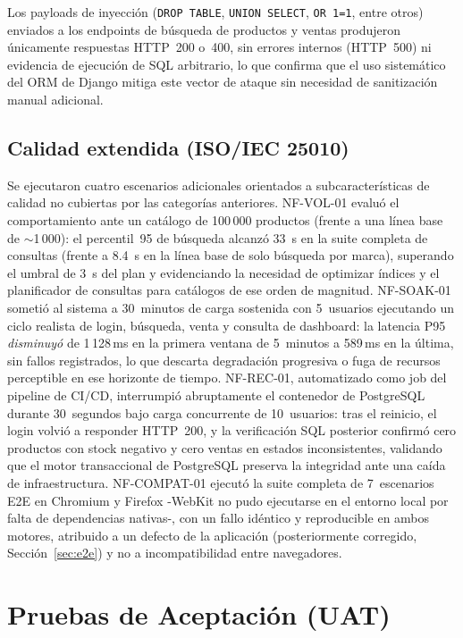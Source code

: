 \documentclass[conference]{IEEEtran}
\begin{document}
Los payloads de inyección (\texttt{DROP TABLE}, \texttt{UNION SELECT}, \texttt{OR 1=1}, entre otros) enviados a los endpoints de búsqueda de productos y ventas produjeron únicamente respuestas HTTP~200 o~400, sin errores internos (HTTP~500) ni evidencia de ejecución de SQL arbitrario, lo que confirma que el uso sistemático del ORM de Django mitiga este vector de ataque sin necesidad de sanitización manual adicional.

\subsection{Calidad extendida (ISO/IEC 25010)}

Se ejecutaron cuatro escenarios adicionales orientados a subcaracterísticas de calidad no cubiertas por las categorías anteriores. NF-VOL-01 evaluó el comportamiento ante un catálogo de 100\,000 productos (frente a una línea base de $\sim$1\,000): el percentil~95 de búsqueda alcanzó 33~s en la suite completa de consultas (frente a 8.4~s en la línea base de solo búsqueda por marca), superando el umbral de 3~s del plan y evidenciando la necesidad de optimizar índices y el planificador de consultas para catálogos de ese orden de magnitud. NF-SOAK-01 sometió al sistema a 30~minutos de carga sostenida con 5~usuarios ejecutando un ciclo realista de login, búsqueda, venta y consulta de dashboard: la latencia P95 \emph{disminuyó} de 1\,128\,ms en la primera ventana de 5~minutos a 589\,ms en la última, sin fallos registrados, lo que descarta degradación progresiva o fuga de recursos perceptible en ese horizonte de tiempo. NF-REC-01, automatizado como job del pipeline de CI/CD, interrumpió abruptamente el contenedor de PostgreSQL durante 30~segundos bajo carga concurrente de 10~usuarios: tras el reinicio, el login volvió a responder HTTP~200, y la verificación SQL posterior confirmó cero productos con stock negativo y cero ventas en estados inconsistentes, validando que el motor transaccional de PostgreSQL preserva la integridad ante una caída de infraestructura. NF-COMPAT-01 ejecutó la suite completa de 7~escenarios E2E en Chromium y Firefox -WebKit no pudo ejecutarse en el entorno local por falta de dependencias nativas-, con un fallo idéntico y reproducible en ambos motores, atribuido a un defecto de la aplicación (posteriormente corregido, Sección~\ref{sec:e2e}) y no a incompatibilidad entre navegadores.

\section{Pruebas de Aceptación (UAT)}
\label{sec:uat}
\end{document}
